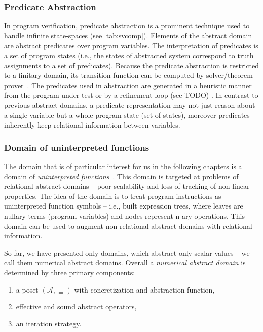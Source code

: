 \subsubsection{Predicate Abstraction}

In program verification, predicate abstraction \cite{Graf1997, Bjorner1997} is
a prominent technique used to handle infinite state-spaces (see
\autoref{tab:svcomp}). Elements of the abstract domain are abstract predicates
over program variables. The interpretation of predicates is a set of program
states (i.e., the states of abstracted system correspond to truth assignments
to a set of predicates). Because the predicate abstraction is restricted to a
finitary domain, its transition function can be computed by \smt solver/theorem
prover~\cite{Cousot2003, Ball2001}. The predicates used in abstraction are
generated in a heuristic manner from the program under test or by a refinement
loop (see TODO) \cite{Flanagan2002}. In contrast to previous abstract domains,
a predicate representation may not just reason about a single variable but a
whole program state (set of states), moreover predicates inherently keep
relational information between variables.


\subsubsection{Domain of uninterpreted functions}

The domain that is of particular interest for us in the following chapters is a
domain of \emph{uninterpreted functions}~\cite{Gange2016}. This domain is targeted
at problems of relational abstract domains -- poor scalability and loss of
tracking of non-linear properties. The idea of the domain is to treat program
instructions as uninterpreted function symbols -- i.e., built expression trees,
where leaves are nullary terms (program variables) and nodes represent n-ary
operations. This domain can be used to augment non-relational abstract domains
with relational information.

\bigskip
\prule
\bigskip

\noindent
So far, we have presented only domains, which abstract only scalar values -- we call
them numerical abstract domains.  Overall a \emph{numerical abstract domain} is
determined by three primary components:

\label{sec:ingredients}
\begin{enumerate}
    \item a poset $(\mathcal{A}, \sqsupseteq)$ with concretization and abstraction function,
    \item effective and sound abstract operators,
    \item an iteration strategy.
\end{enumerate}


